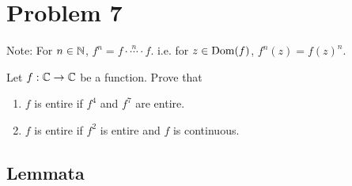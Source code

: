 \section*{Problem 7}

Note: For \(n \in \mathbb{N}\), \(f^n = f \cdot \stackrel{n}{\cdots} \cdot f\). i.e. for \(z \in \textnormal{Dom}(f)\), \(f^n(z) = f(z)^n\).

Let \(f: \mathbb{C} \to \mathbb{C}\) be a function.
Prove that
\begin{enumerate}[label=(\arabic*)]
\item \(f\) is entire if \(f^4\) and \(f^7\) are entire.
\item \(f\) is entire if \(f^2\) is entire and \(f\) is continuous.
\end{enumerate}

\subsection*{Lemmata}

